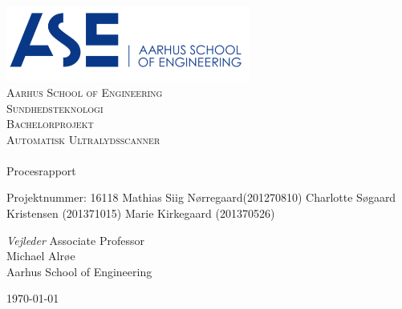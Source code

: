 \begin{titlingpage}
\begin{center}

~ \\[3cm]

\includegraphics[width=0.6\textwidth]{figurer/ASE}~\\[1cm]

\textsc{\LARGE Aarhus School of Engineering}\\[1.5cm]

\textsc{\Large Sundhedsteknologi}\\
\textsc{\Large Bachelorprojekt}\\[0.5cm]
\textsc{\Large Automatisk Ultralydsscanner} \\[1cm]

\noindent\makebox[\linewidth]{\rule{\textwidth}{0.4pt}}\\
[0.5cm]{\Huge Procesrapport}
\noindent\makebox[\linewidth]{\rule{\textwidth}{0.4pt}}

\end{center}
Projektnummer: 16118 \newline
Mathias Siig Nørregaard(201270810) \newline
Charlotte Søgaard Kristensen (201371015) \newline		 
Marie Kirkegaard (201370526) \newline 


\textit{Vejleder} \newline
Associate Professor\\
Michael Alrøe\\
Aarhus School of Engineering


\vfill

\begin{center}
{\large \today}
\end{center}

\end{titlingpage}